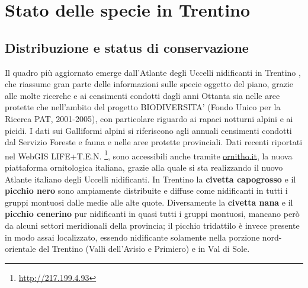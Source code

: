 \documentclass[10pt,twoside,openany,x11names,svgnames,italian,a5paper,dvipsnames,table]{memoir}
\newcommand\chapterillustration{}
\begin{document}
 
\chapter{Stato delle specie in Trentino}
\renewcommand\chapterillustration{2.JPG}
\section{Distribuzione e status di conservazione}
Il quadro più aggiornato emerge dall’Atlante degli Uccelli nidificanti in Trentino \cite{Pedrini05}, che riassume gran parte delle informazioni sulle specie oggetto del piano, grazie alle molte ricerche e ai censimenti condotti dagli anni Ottanta sia nelle aree protette che nell’ambito del progetto BIODIVERSITA’ (Fondo Unico per la Ricerca PAT, 2001-2005), con particolare riguardo ai rapaci notturni alpini e ai picidi. I dati sui Galliformi alpini si riferiscono agli annuali censimenti condotti dal Servizio Foreste e fauna e nelle aree protette provinciali. Dati recenti riportati nel WebGIS LIFE+T.E.N. \footnote{\url{http://217.199.4.93}}, sono accessibili anche tramite \url{ornitho.it}, la nuova piattaforma ornitologica italiana, grazie alla quale si sta realizzando il nuovo Atlante italiano degli Uccelli nidificanti.
In Trentino la \textbf{civetta capogrosso} e il \textbf{picchio nero} sono ampiamente distribuite e diffuse come nidificanti in tutti i gruppi montuosi dalle medie alle alte quote. Diversamente la \textbf{civetta nana} e il \textbf{picchio cenerino} pur nidificanti in quasi tutti i gruppi montuosi, mancano però da alcuni settori meridionali della provincia; il picchio tridattilo è invece presente in modo assai localizzato, essendo nidificante solamente nella porzione nord-orientale del Trentino (Valli dell’Avisio e Primiero) e in Val di Sole. 
\end{document}

